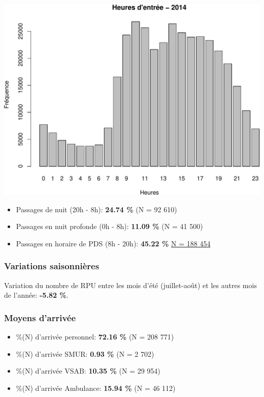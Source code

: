 \documentclass[]{article}
\begin{document}
\includegraphics{rapport2014_V4_files/figure-latex/horaires-1.pdf}

\begin{itemize}
\item
  Passages de nuit (20h - 8h): \textbf{24.74 \%} (N = 92 610)
\item
  Passages en nuit profonde (0h - 8h): \textbf{11.09 \%} (N = 41 500)
\item
  Passages en horaire de PDS (8h - 20h): \textbf{45.22 \%}
  \href{Remarque:\%20ne\%20tient\%20pas\%20compte\%20des\%20jours\%20fériés\%20survenant\%20en\%20semaine}{N
  = 188 454}
\end{itemize}

\subsubsection{Variations saisonnières}\label{variations-saisonnieres}

Variation du nombre de RPU entre les mois d'été (juillet-août) et les
autres mois de l'année: \textbf{-5.82 \%}.

\subsubsection{Moyens d'arrivée}\label{moyens-darrivee}

\begin{itemize}
\itemsep1pt\parskip0pt
\item
  \%(N) d'arrivée personnel: \textbf{72.16 \%} (N = 208 771)
\item
  \%(N) d'arrivée SMUR: \textbf{0.93 \%} (N = 2 702)
\item
  \%(N) d'arrivée VSAB: \textbf{10.35 \%} (N = 29 954)
\item
  \%(N) d'arrivée Ambulance: \textbf{15.94 \%} (N = 46 112)
\end{itemize}
\end{document}
